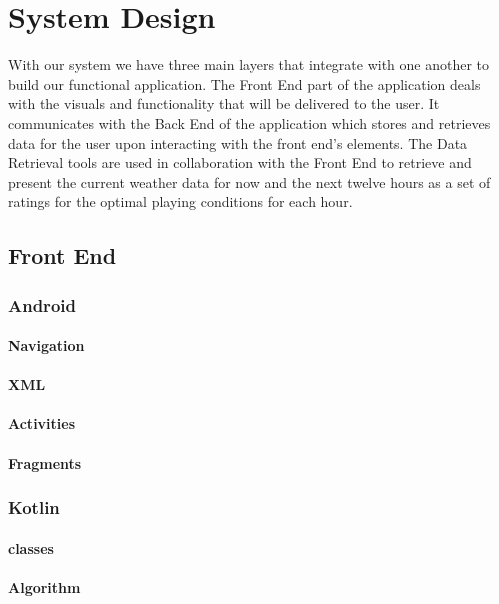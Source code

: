 \chapter{System Design}
With our system we have three main layers that integrate with one another to build our functional application. The Front End part of the application deals with the visuals and functionality that will be delivered to the user. It communicates with the Back End of the application which stores and retrieves data for the user upon interacting with the front end's elements. The Data Retrieval tools are used in collaboration with the Front End to retrieve and present the current weather data for now and the next twelve hours as a set of ratings for the optimal playing conditions for each hour.

\section{Front End}
\subsection{Android}
\subsubsection{Navigation}
\subsubsection{XML}
\subsubsection{Activities}
\subsubsection{Fragments}
\subsection{Kotlin}
\subsubsection{classes}
\subsubsection{Algorithm}
